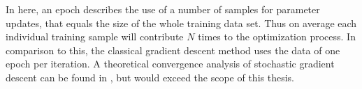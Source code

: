 \documentclass[11pt, a4paper]{article}
\newtheorem{algorithm}[theorem]{Algorithm}
\newcommand{\N}{\mathbb{N}}
\newcommand{\R}{\mathbb{R}}
\newcommand{\I}{\mathcal{I}}
\begin{document}
In here, an epoch describes the use of a number of samples for parameter updates, that equals the size of the whole training data set. Thus on average each individual training sample will contribute $N$ times to the optimization process. In comparison to this, the classical gradient descent method uses the data of one epoch per iteration. A theoretical convergence analysis of stochastic gradient descent can be found in \cite{SGD}, but would exceed the scope of this thesis. \\



\end{document}
